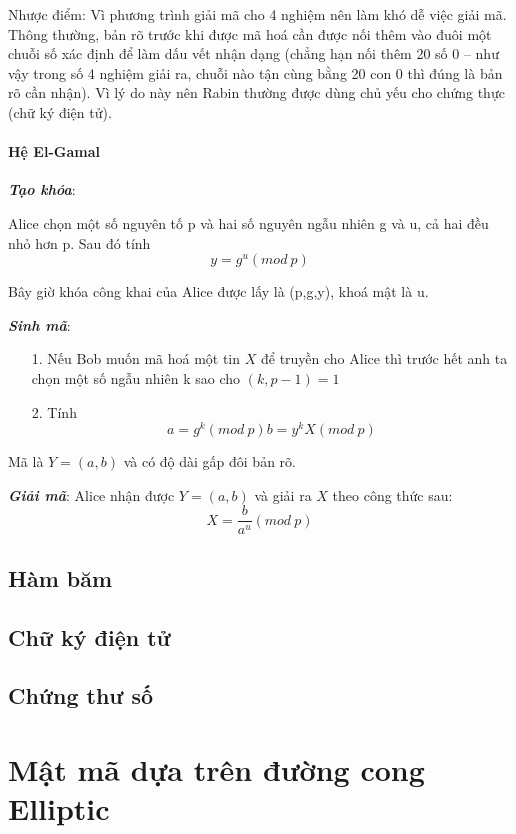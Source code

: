 \documentclass[a4paper,12pt]{report}
\begin{document}
Nhược điểm: Vì phương trình giải mã cho 4 nghiệm nên làm khó dễ việc giải mã. Thông thường, bản rõ trước khi được mã hoá cần được nối thêm vào đuôi một chuỗi số xác định để làm dấu vết nhận dạng (chẳng hạn nối thêm 20 số 0 – như vậy trong số 4 nghiệm giải ra, chuỗi nào tận cùng bằng 20 con 0 thì đúng là bản rõ cần nhận). Vì lý do này nên Rabin thường được dùng chủ yếu cho chứng thực (chữ ký điện tử).

\subsubsection{Hệ El-Gamal}
\textbf{\textit{Tạo khóa}}:

Alice chọn một số nguyên tố p và hai số nguyên ngẫu nhiên g và u, cả hai đều nhỏ hơn p. Sau đó tính 
\begin{displaymath}
y = g^u (mod \ p)
\end{displaymath}

Bây giờ khóa công khai của Alice được lấy là (p,g,y), khoá mật là u.

\textbf{\textit{Sinh mã}}:
\begin{itemize}
\item[1. ] Nếu Bob muốn mã hoá một tin $X$ để truyền cho Alice thì trước hết anh ta chọn một số ngẫu nhiên k sao cho $(k,p-1) = 1$
\item[2. ] Tính 
\begin{displaymath}
a = g^k(mod \ p)
b = y^kX(mod \ p)
\end{displaymath}
\end{itemize}

Mã là $Y = (a,b)$ và có độ dài gấp đôi bản rõ.

\textbf{\textit{Giải mã}}: Alice nhận được $Y = (a,b)$ và giải ra $X$ theo công thức sau:
\begin{displaymath}
X = \frac{b}{a^u} (mod \ p)
\end{displaymath}
\section{Hàm băm}
\section{Chữ ký điện tử}
\section{Chứng thư số}
\chapter{Mật mã dựa trên đường cong Elliptic}
\end{document}
